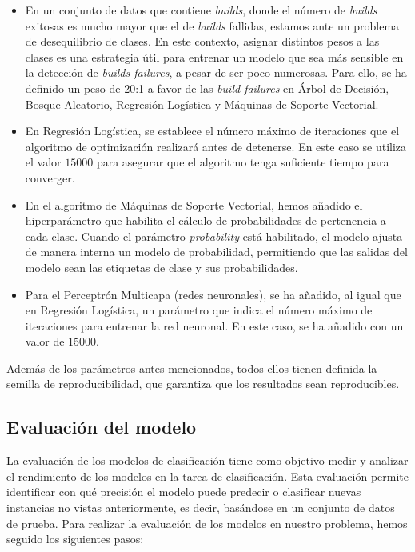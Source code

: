 \begin{itemize}
	\item En un conjunto de datos que contiene \textit{builds}, donde el número de \textit{builds}
    exitosas es mucho mayor que el de \textit{builds} fallidas, estamos ante un problema de
    desequilibrio de clases. En este contexto, asignar distintos pesos a las clases es una
    estrategia útil para entrenar un modelo que sea más sensible en la detección de
    \textit{builds failures}, a pesar de ser poco numerosas. Para ello, se ha definido un peso de
    20:1 a favor de las \textit{build failures} en Árbol de Decisión, Bosque Aleatorio, Regresión
    Logística y Máquinas de Soporte Vectorial.\\

	\item En Regresión Logística, se establece el número máximo de iteraciones que el algoritmo de
    optimización realizará antes de detenerse. En este caso se utiliza el valor $15000$ para
    asegurar que el algoritmo tenga suficiente tiempo para converger.\\

	\item En el algoritmo de Máquinas de Soporte Vectorial, hemos añadido el hiperparámetro que
    habilita el cálculo de probabilidades de pertenencia a cada clase. Cuando el parámetro
    \textit{probability} está habilitado, el modelo ajusta de manera interna un modelo de
    probabilidad, permitiendo que las salidas del modelo sean las etiquetas de clase y sus
    probabilidades.\\

	\item Para el Perceptrón Multicapa (redes neuronales), se ha añadido, al igual que en Regresión
    Logística, un parámetro que indica el número máximo de iteraciones para entrenar la red
    neuronal. En este caso, se ha añadido con un valor de $15000$.
\end{itemize}

Además de los parámetros antes mencionados, todos ellos tienen definida la semilla de
reproducibilidad, que garantiza que los resultados sean reproducibles.

\subsection{Evaluación del modelo}
La evaluación de los modelos de clasificación tiene como objetivo medir y analizar el rendimiento
de los modelos en la tarea de clasificación. Esta evaluación permite identificar con qué precisión
el modelo puede predecir o clasificar nuevas instancias no vistas anteriormente, es decir, basándose
en un conjunto de datos de prueba. Para realizar la evaluación de los modelos en nuestro problema,
hemos seguido los siguientes pasos:

